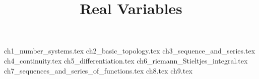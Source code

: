 \documentclass[]{report}
\title{Real Variables}
\begin{document}
\maketitle
{ch1_number_systems.tex}
{ch2_basic_topology.tex}
{ch3_sequence_and_series.tex}
{ch4_continuity.tex}
{ch5_differentiation.tex}
{ch6_riemann_Stieltjes_integral.tex}
{ch7_sequences_and_series_of_functions.tex}
{ch8.tex}
{ch9.tex}
\end{document}
